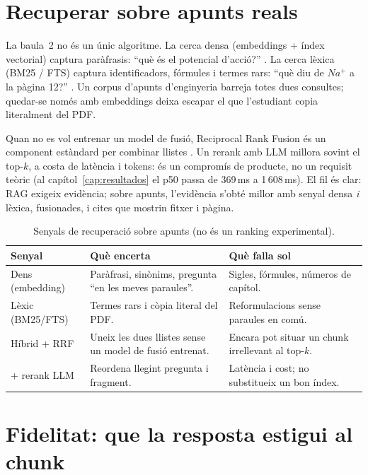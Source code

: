\section{Recuperar sobre apunts reals}

La baula~2 no és un únic algoritme. La cerca densa (embeddings + índex vectorial) captura paràfrasis: ``què és el potencial d'acció?'' \parencite{karpukhin2020dpr}. La cerca lèxica (BM25 / FTS) captura identificadors, fórmules i termes rars: ``què diu de $Na^+$ a la pàgina 12?'' \parencite{robertson2009probabilistic}. Un corpus d'apunts d'enginyeria barreja totes dues consultes; quedar-se només amb embeddings deixa escapar el que l'estudiant copia literalment del PDF.

Quan no es vol entrenar un model de fusió, Reciprocal Rank Fusion és un component estàndard per combinar llistes \parencite{cormack2009rrf}. Un rerank amb LLM millora sovint el top-$k$, a costa de latència i tokens: és un compromís de producte, no un requisit teòric (al capítol~\ref{cap:resultados} el p50 passa de 369\,ms a 1\,608\,ms). El fil és clar: RAG exigeix evidència; sobre apunts, l'evidència s'obté millor amb senyal densa \emph{i} lèxica, fusionades, i cites que mostrin fitxer i pàgina.

\begin{table}[htbp]
\centering
\caption{Senyals de recuperació sobre apunts (no és un ranking experimental).}
\label{tab:senyals}
\small
\begin{tabularx}{\textwidth}{lXX}
\toprule
Senyal & Què encerta & Què falla sol \\
\midrule
Dens (embedding) & Paràfrasi, sinònims, pregunta ``en les meves paraules''. & Sigles, fórmules, números de capítol. \\
Lèxic (BM25/FTS) & Termes rars i còpia literal del PDF. & Reformulacions sense paraules en comú. \\
Híbrid + RRF & Uneix les dues llistes sense un model de fusió entrenat. & Encara pot situar un chunk irrellevant al top-$k$. \\
+ rerank LLM & Reordena llegint pregunta i fragment. & Latència i cost; no substitueix un bon índex. \\
\bottomrule
\end{tabularx}
\end{table}

\section{Fidelitat: que la resposta estigui al chunk}

